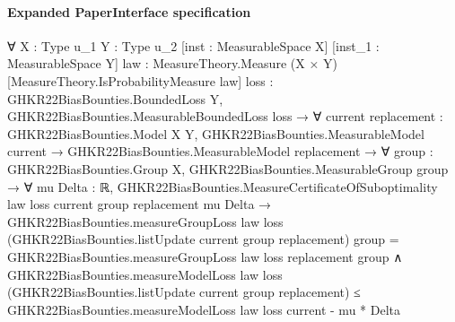 \documentclass[10pt]{article}
\begin{document}
\paragraph{Expanded PaperInterface specification}
\begin{ReviewVerbatim}
∀ {X : Type u_1} {Y : Type u_2} [inst : MeasurableSpace X] [inst_1 : MeasurableSpace Y]
  {law : MeasureTheory.Measure (X × Y)} [MeasureTheory.IsProbabilityMeasure law]
  {loss : GHKR22BiasBounties.BoundedLoss Y},
  GHKR22BiasBounties.MeasurableBoundedLoss loss →
    ∀ {current replacement : GHKR22BiasBounties.Model X Y},
      GHKR22BiasBounties.MeasurableModel current →
        GHKR22BiasBounties.MeasurableModel replacement →
          ∀ {group : GHKR22BiasBounties.Group X},
            GHKR22BiasBounties.MeasurableGroup group →
              ∀ {mu Delta : ℝ},
                GHKR22BiasBounties.MeasureCertificateOfSuboptimality law loss current group replacement mu Delta →
                  GHKR22BiasBounties.measureGroupLoss law loss (GHKR22BiasBounties.listUpdate current group replacement)
                        group =
                      GHKR22BiasBounties.measureGroupLoss law loss replacement group ∧
                    GHKR22BiasBounties.measureModelLoss law loss
                        (GHKR22BiasBounties.listUpdate current group replacement) ≤
                      GHKR22BiasBounties.measureModelLoss law loss current - mu * Delta
\end{ReviewVerbatim}
\end{document}
